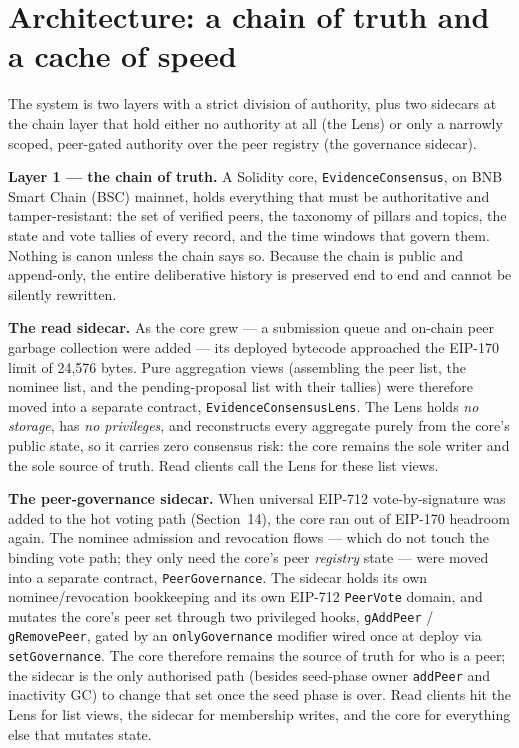 \documentclass[11pt,a4paper]{article}
\begin{document}
\section{Architecture: a chain of truth and a cache of speed}

The system is two layers with a strict division of authority, plus two
sidecars at the chain layer that hold either no authority at all (the
Lens) or only a narrowly scoped, peer-gated authority over the peer
registry (the governance sidecar).

\textbf{Layer 1 --- the chain of truth.} A Solidity core,
\texttt{EvidenceConsensus}, on BNB Smart Chain (BSC) mainnet, holds
everything that must be authoritative and tamper-resistant: the set of
verified peers, the taxonomy of pillars and topics, the state and vote
tallies of every record, and the time windows that govern them. Nothing
is canon unless the chain says so. Because the chain is public and
append-only, the entire deliberative history is preserved end to end and
cannot be silently rewritten.

\textbf{The read sidecar.} As the core grew --- a submission queue and
on-chain peer garbage collection were added --- its deployed bytecode
approached the EIP-170 limit of 24{,}576 bytes. Pure aggregation views
(assembling the peer list, the nominee list, and the pending-proposal list
with their tallies) were therefore moved into a separate contract,
\texttt{EvidenceConsensusLens}. The Lens holds \emph{no storage}, has
\emph{no privileges}, and reconstructs every aggregate purely from the
core's public state, so it carries zero consensus risk: the core remains
the sole writer and the sole source of truth. Read clients call the Lens
for these list views.

\textbf{The peer-governance sidecar.} When universal EIP-712
vote-by-signature was added to the hot voting path (Section~14), the
core ran out of EIP-170 headroom again. The nominee admission and
revocation flows --- which do not touch the binding vote path; they only
need the core's peer \emph{registry} state --- were moved into a
separate contract, \texttt{PeerGovernance}. The sidecar holds its own
nominee/revocation bookkeeping and its own EIP-712
\texttt{PeerVote} domain, and mutates the core's peer set through two
privileged hooks, \texttt{gAddPeer} / \texttt{gRemovePeer}, gated by an
\texttt{onlyGovernance} modifier wired once at deploy via
\texttt{setGovernance}. The core therefore remains the source of truth
for who is a peer; the sidecar is the only authorised path (besides
seed-phase owner \texttt{addPeer} and inactivity GC) to change that set
once the seed phase is over. Read clients hit the Lens for list views,
the sidecar for membership writes, and the core for everything else
that mutates state.
\end{document}
